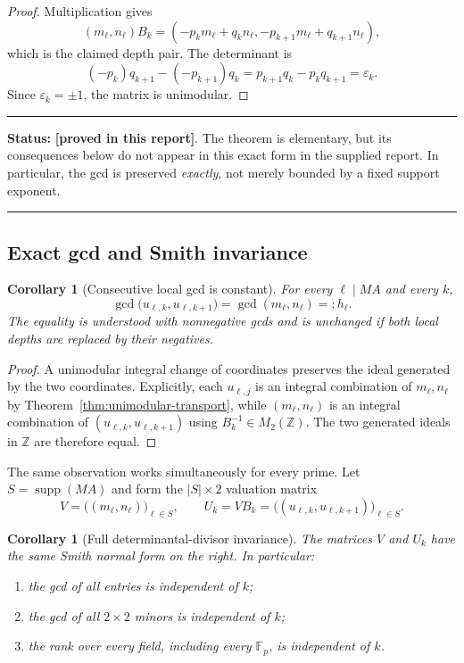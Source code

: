 \documentclass[11pt,oneside]{article}
\newtheorem{corollary}[theorem]{Corollary}
\theoremstyle{definition}
\theoremstyle{remark}
\newcommand{\Z}{\mathbb Z}
\newcommand{\eps}{\varepsilon}
\newcommand{\supp}{\operatorname{supp}}
\newcommand{\provedhere}{\textcolor{proofgreen}{\textbf{[proved in this report]}}}
\newenvironment{statusbox}[1]
{\begin{center}\begin{minipage}{0.94\textwidth}\raggedright\hrule\vspace{0.45em}\textbf{Status:} #1\par\vspace{0.35em}}
{\vspace{0.35em}\hrule\end{minipage}\end{center}}
\begin{document}
\begin{proof}
Multiplication gives
\[
 (m_\ell,n_\ell)B_k
 =(-p_km_\ell+q_kn_\ell,
   -p_{k+1}m_\ell+q_{k+1}n_\ell),
\]
which is the claimed depth pair.  The determinant is
\[
 (-p_k)q_{k+1}-(-p_{k+1})q_k
 =p_{k+1}q_k-p_kq_{k+1}=\eps_k.
\]
Since $\eps_k=\pm1$, the matrix is unimodular.
\end{proof}

\begin{statusbox}{\provedhere.  The theorem is elementary, but its consequences below do
not appear in this exact form in the supplied report.  In particular, the gcd is preserved
\emph{exactly}, not merely bounded by a fixed support exponent.}
\end{statusbox}

\subsection{Exact gcd and Smith invariance}

\begin{corollary}[Consecutive local gcd is constant]
\label{cor:gcd-invariance}
For every $\ell\mid MA$ and every $k$,
\begin{equation}
 \gcd\bigl(u_{\ell,k},u_{\ell,k+1}\bigr)
 =\gcd(m_\ell,n_\ell)=:h_\ell.
 \label{eq:gcd-invariance}
\end{equation}
The equality is understood with nonnegative gcds and is unchanged if both local depths are
replaced by their negatives.
\end{corollary}

\begin{proof}
A unimodular integral change of coordinates preserves the ideal generated by the two
coordinates.  Explicitly, each $u_{\ell,j}$ is an integral combination of $m_\ell,n_\ell$
by Theorem~\ref{thm:unimodular-transport}, while $(m_\ell,n_\ell)$ is an integral
combination of $(u_{\ell,k},u_{\ell,k+1})$ using $B_k^{-1}\in M_2(\Z)$.
The two generated ideals in $\Z$ are therefore equal.
\end{proof}

The same observation works simultaneously for every prime.  Let $S=\supp(MA)$ and form the
$|S|\times2$ valuation matrix
\begin{equation}
 V=\bigl((m_\ell,n_\ell)\bigr)_{\ell\in S},
 \qquad
 U_k=VB_k=\bigl((u_{\ell,k},u_{\ell,k+1})\bigr)_{\ell\in S}.
 \label{eq:VU}
\end{equation}

\begin{corollary}[Full determinantal-divisor invariance]
\label{cor:smith-invariance}
The matrices $V$ and $U_k$ have the same Smith normal form on the right.  In particular:
\begin{enumerate}
\item the gcd of all entries is independent of $k$;
\item the gcd of all $2\times2$ minors is independent of $k$;
\item the rank over every field, including every $\mathbb F_p$, is independent of $k$.
\end{enumerate}
\end{corollary}
\end{document}
